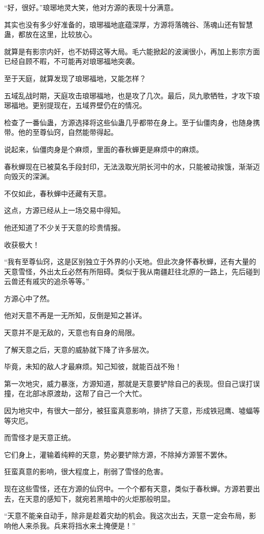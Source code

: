 \begin{this_body}
“好，很好。”琅琊地灵大笑，他对方源的表现十分满意。

其实也没有多少好准备的，琅琊福地底蕴深厚，方源将落魄谷、荡魂山还有智慧蛊，都放在这里，比较放心。

就算是有影宗内奸，也不妨碍这等大局。毛六能掀起的波澜很小，再加上影宗方面已经自顾不暇，不可能再对琅琊福地突袭。

至于天庭，就算发现了琅琊福地，又能怎样？

五域乱战时期，天庭攻击琅琊福地，也是攻了几次。最后，凤九歌牺牲，才攻下琅琊福地。更别提现在，五域界壁仍在的情况。

检查了一番仙蛊，方源选择将这些仙蛊几乎都带在身上。至于仙僵肉身，也随身携带。他的至尊仙窍，自然能带得起。

说起来，仙僵肉身是个麻烦，里面的春秋蝉更是麻烦中的麻烦。

春秋蝉现在已被莫名手段封印，无法汲取光阴长河中的水，只能被动挨饿，渐渐迈向毁灭的深渊。

不仅如此，春秋蝉中还藏有天意。

这点，方源已经从上一场交易中得知。

他还知道了不少关于天意的珍贵情报。

收获极大！

“我有至尊仙窍，这是区别独立于外界的小天地。但此次身怀春秋蝉，还有大量的天意雪怪，外出太丘必然有所阻碍。类似于我从南疆赶往北原的一路上，先后碰到云兽还有戚灾的追杀等等。”

方源心中了然。

他对天意不再是一无所知，反倒是知之甚详。

天意并不是无敌的，天意也有自身的局限。

了解天意之后，天意的威胁就下降了许多层次。

毕竟，未知的敌人才最麻烦。知己知彼，就能百战不殆！

第一次地灾，威力暴涨，方源知道，那就是天意要铲除自己的表现。但自己误打误撞，在北部冰原渡劫，这帮了自己一个大忙。

因为地灾中，有很大一部分，被狂蛮真意影响，排挤了天意，形成铁冠鹰、墟蝠等等灾厄。

而雪怪才是天意正统。

它们身上，灌输着纯粹的天意，势必要铲除方源，不除掉方源誓不罢休。

狂蛮真意的影响，很大程度上，削弱了雪怪的危害。

现在这些雪怪，还在方源的仙窍中。一个个都有天意，类似于春秋蝉。方源若要出去，在天意的感知下，就宛若黑暗中的火炬那般明显。

“天意不能亲自动手，除非是趁着灾劫的机会。我这次出去，天意一定会布局，影响他人来杀我。兵来将挡水来土掩便是！”


\end{this_body}
